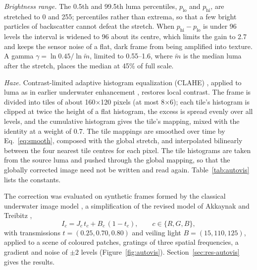 \emph{Brightness range.} The 0.5th and 99.5th luma percentiles,
$p_\mathrm{lo}$ and
$p_\mathrm{hi}$, are stretched to 0 and 255; percentiles rather than
extrema, so that
a few bright particles of backscatter cannot defeat the stretch. When
$p_\mathrm{hi} - p_\mathrm{lo}$ is under 96 levels the interval is
widened to 96 about
its centre, which limits the gain to 2.7 and keeps the sensor noise
of a flat, dark
frame from being amplified into texture. A gamma $\gamma = \ln 0.45 /
\ln \tilde m$,
limited to 0.55--1.6, where $\tilde m$ is the median luma after the
stretch, places
the median at 45\% of full scale.

\emph{Haze.} Contrast-limited adaptive histogram equalization (CLAHE)
\cite{pizer1987,zuiderveld1994}, applied to luma as in earlier underwater
enhancement \cite{hitam2013}, restores local contrast. The frame is divided into
tiles of about 160$\times$120 pixels (at most 8$\times$6); each
tile's histogram is
clipped at twice the height of a flat histogram, the excess is spread
evenly over all
levels, and the cumulative histogram gives the tile's mapping, mixed
with the identity
at a weight of 0.7. The tile mappings are smoothed over time by
Eq.~\eqref{eq:smooth},
composed with the global stretch, and interpolated bilinearly between
the four nearest
tile centres for each pixel. The tile histograms are taken from the
source luma and
pushed through the global mapping, so that the globally corrected
image need not be
written and read again. Table~\ref{tab:autovis} lists the constants.

The correction was evaluated on synthetic frames formed by the
classical underwater
image model \cite{jaffe1990}, a simplification of the revised model of
Akkaynak and Treibitz \cite{akkaynak2018},
\begin{equation}\label{eq:water}
  I_c = J_c\,t_c + B_c\,(1 - t_c), \qquad c \in \{R, G, B\},
\end{equation}
with transmissions $t = (0.25, 0.70, 0.80)$ and veiling light $B =
(15, 110, 125)$,
applied to a scene of coloured patches, gratings of three spatial frequencies, a
gradient and noise of $\pm 2$ levels (Figure~\ref{fig:autovis}).
Section~\ref{sec:res-autovis} gives the results.

